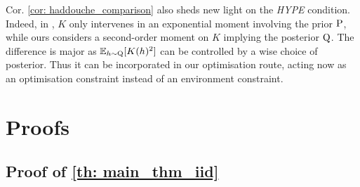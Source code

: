Cor. \ref{cor: haddouche_comparison} also sheds new light on the \emph{HYPE} condition. Indeed, in \citet{haddouche2021pac}, $K$ only intervenes in an exponential moment involving the prior $\P$, while ours considers a second-order moment on $K$ implying the posterior $\Q$. The difference is major as $\mathbb{E}_{h\sim \Q}[K(h)^2] $ can be controlled by a wise choice of posterior. Thus it can be incorporated in our optimisation route, acting now as an optimisation constraint instead of an environment constraint.



\section{Proofs}
\label{sec: proofs}

\subsection{Proof of \cref{th: main_thm_iid}}

